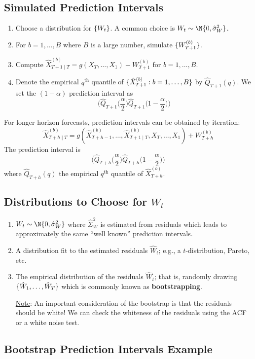 \subsection*{Simulated Prediction Intervals}
\begin{enumerate}[(1)]
    \item Choose a distribution for $ \{W_t\} $. A common choice is $ W_t \sim \N{0,\hat{\sigma}_W^2} $.
    \item For $ b=1,\ldots,B $ where $ B $ is a large number, simulate $ \{W_{T+1}^{(b)}\} $.
    \item Compute $ \hat{X}_{T+1\mid T}^{(b)}=g(X_{T},\ldots,X_1)+W_{T+1}^{(b)} $
          for $ b=1,\ldots,B $.
    \item Denote the empirical $ q^{\text{th}} $ quantile of $ \{\hat{X}_{T+1}^{(b)}:b=1,\ldots,B\} $
          by $ \hat{Q}_{T+1}(q) $. We set the $ (1-\alpha) $ prediction interval as
          \[ \biggl(\hat{Q}_{T+1}\biggl(\frac{\alpha}{2} \biggr)\hat{Q}_{T+1}\biggl(1-\frac{\alpha}{2} \biggr)\biggr) \]
\end{enumerate}
\begin{Remark}{}{}
    For longer horizon forecasts, prediction intervals can be obtained by iteration:
    \[ \hat{X}_{T+h\mid T}^{(b)}=g(\hat{X}_{T+h-1}^{(b)},\ldots,\hat{X}_{T+1\mid T}^{(b)},X_T,\ldots,X_1)+W_{T+h}^{(b)} \]
    The prediction interval is
    \[ \biggl(\hat{Q}_{T+h}\biggl(\frac{\alpha}{2} \biggr)\hat{Q}_{T+h}\biggl(1-\frac{\alpha}{2} \biggr)\biggr) \]
    where $ \hat{Q}_{T+h}(q) $ the empirical $ q^{\text{th}} $ quantile of $ \hat{X}_{T+h}^{(b)} $.
\end{Remark}
\subsection*{Distributions to Choose for $ W_t $}
\begin{enumerate}[(1)]
    \item $ W_t \sim \N{0,\hat{\sigma}_W^2} $ where $ \hat{\Sigma}_W^2 $ is estimated from residuals which
          leads to approximately the same ``well known'' prediction intervals.
    \item A distribution fit to the estimated residuals $ \hat{W}_t $; e.g., a $ t $-distribution,
          Pareto, etc.
    \item The empirical distribution of the residuals $ \hat{W}_t $; that is,
          randomly drawing $ \{\hat{W}_1,\ldots,\hat{W}_{T}\} $ which is commonly known
          as \textbf{bootstrapping}.

          \underline{Note}: An important consideration of the bootstrap is that the residuals should be white!
          We can check the whiteness of the residuals using the ACF or a white noise test.
\end{enumerate}
\subsection*{Bootstrap Prediction Intervals Example}
